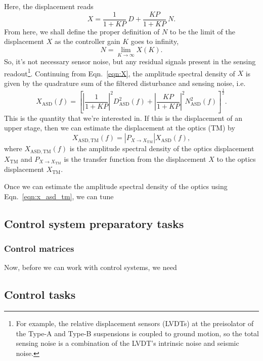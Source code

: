 Here, the displacement reads
\begin{equation}
	X=\frac{1}{1+KP}\ D + \frac{KP}{1+KP}\ N.
	\label{eqn:X}
\end{equation}
From here, we shall define the proper definition of $N$ to be the limit of the displacement $X$ as the controller gain $K$ goes to infinity,
\begin{equation}
	N = \lim_{K\to\infty} X(K).
\end{equation}
So, it's not necessary sensor noise, but any residual signals present in the sensing readout\footnote{For example, the relative displacement sensors (LVDTs) at the preisolator of the Type-A and Type-B suspensions is coupled to ground motion, so the total sensing noise is a combination of the LVDT's intrinsic noise and seismic noise.}.
Continuing from Eqn.~\eqref{eqn:X}, the amplitude spectral density of $X$ is given by the quadrature sum of the filtered disturbance and sensing noise, i.e.
\begin{equation}
	X_\mathrm{ASD}(f) = \left[\left\lvert\frac{1}{1+KP}\right\rvert^2 D_\mathrm{ASD}^2(f) + \left\lvert\frac{KP}{1+KP}\right\rvert^2 N_\mathrm{ASD}^2(f)\right]^{\frac{1}{2}}.
\end{equation}
This is the quantity that we're interested in.
If this is the displacement of an upper stage, then we can estimate the displacement at the optics (TM) by
\begin{equation}
	X_\mathrm{ASD, TM}(f) = \left\lvert P_{X\to X_\mathrm{TM}}\right\rvert X_\mathrm{ASD}(f),
	\label{eqn:x_asd_tm}
\end{equation}
where $X_\mathrm{ASD, TM}(f)$ is the amplitude spectral density of the optics displacement $X_\mathrm{TM}$ and $P_{X\to X_\mathrm{TM}}$ is the transfer function from the displacement $X$ to the optics displacement $X_\mathrm{TM}$.

Once we can estimate the amplitude spectral density of the optics using Eqn.~\eqref{eqn:x_asd_tm}, we can tune 

\subsection{Control system preparatory tasks}
\subsubsection{Control matrices}
Now, before we can work with control systems, we need 
\subsection{Control tasks}

